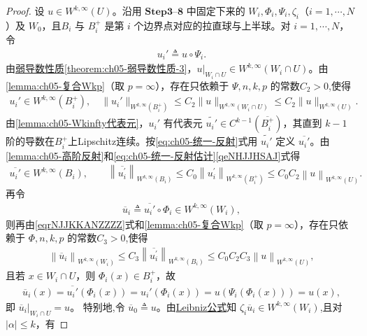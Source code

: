 \documentclass[../../main.tex]{subfiles}
\begin{document}
\begin{proof}
设 $u\in W^{k,\infty}(U)$。沿用 $\mathbf{Step}\bm{3}$--$\mathbf{8}$ 中固定下来的 $W_i,\Phi_i,\Psi_i,\zeta_i$（$i=1,\cdots,N$）及 $W_0$，且$B_i$ 与 $B_i^{+}$ 是第 $i$ 个边界点对应的拉直球与上半球。对 $i=1,\cdots,N$，令
\begin{align*}
u_i'\triangleq u\circ\Psi_i.
\end{align*}
由\hyperref[theorem:ch05-弱导数性质]{弱导数性质\ref{theorem:ch05-弱导数性质-3}}，$u|_{W_i\cap U}\in W^{k,\infty}(W_i\cap U)$。由\cref{lemma:ch05-复合Wkp}（取 $p=\infty$），存在只依赖于 $\Psi,n,k,p$ 的常数$C_2>0$,使得
\begin{align}\label{qeNHJJHSAJ}
u_i'\in W^{k,\infty}(B_i^{+}),\quad
\|u_i'\|_{W^{k,\infty}(B_i^{+})}\leqslant C_2\|u\|_{W^{k,\infty}(W_i\cap U)}\leqslant C_2\|u\|_{W^{k,\infty}(U)}.
\end{align}
由\cref{lemma:ch05-Wkinfty代表元}，$u_i'$ 有代表元 $\widetilde{u_i'}\in C^{k-1}(\overline{B_i^{+}})$，其直到 $k-1$ 阶的导数在$B_i^+$上Lipschitz连续。按\eqref{eq:ch05-统一-反射}式用 $\widetilde{u_i'}$ 定义 $\overline{u_i'}$。由\cref{lemma:ch05-高阶反射}和\eqref{eq:ch05-统一-反射估计}\eqref{qeNHJJHSAJ}式得
\begin{align}\label{eqrNJJKKANZZZZ}
\overline{u_i'}\in W^{k,\infty}(B_i),\qquad
\left\| \overline{u_{i}^{\prime}} \right\| _{W^{k,\infty}\left( B_i \right)}\leqslant C_0\left\| u_{i}^{\prime} \right\| _{W^{k,\infty}(B_{i}^{+})}\leqslant C_0C_2\left\| u \right\| _{W^{k,\infty}\left( U \right)}.
\end{align}
再令
\begin{align*}
\overline{u}_i\triangleq\overline{u_i'}\circ\Phi_i\in W^{k,\infty}(W_i),
\end{align*}
则再由\eqref{eqrNJJKKANZZZZ}式和\cref{lemma:ch05-复合Wkp}（取 $p=\infty$），存在只依赖于 $\Phi,n,k,p$ 的常数$C_3>0$,使得
\begin{align}
\left\| \overline{u}_i \right\| _{W^{k,\infty}\left( W_i \right)}\leqslant C_3\left\| \overline{u_{i}^{\prime}} \right\| _{W^{k,\infty}\left( B_i \right)}\leqslant C_0C_2C_3\left\| u \right\| _{W^{k,\infty}\left( U \right)},\label{eqnjkNJNS}
\end{align}
且若 $x\in W_i\cap U$，则 $\Phi_i(x)\in B_i^{+}$，故
\begin{align*}
\overline{u}_i(x)=\overline{u_i'}(\Phi_i(x))=u_i'(\Phi_i(x))=u(\Psi_i(\Phi_i(x)))=u(x),
\end{align*}
即 $\overline{u}_i|_{W_i\cap U}=u$。
特别地,令 $\overline{u}_0\triangleq u$。由\hyperref[theorem:ch05-弱导数性质]{Leibniz公式}知 $\zeta_i\overline{u}_i\in W^{k,\infty}(W_i)$,且对 $|\alpha|\leqslant k$，有

\end{proof}
\end{document}
